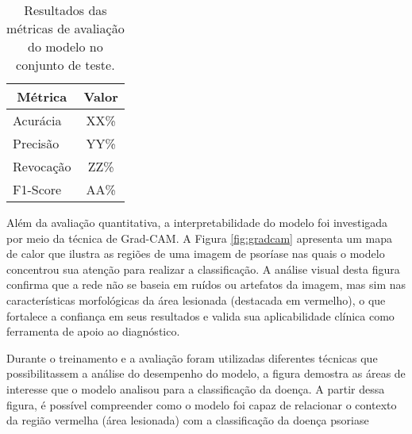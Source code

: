 \begin{table}[h]
  \centering
  \label{tab:resultados_metricas}
  \begin{tabular}{|l|c|}
  \hline
  \multicolumn{1}{|c|}{\textbf{Métrica}} & \textbf{Valor} \\ \hline
  Acurácia                               & XX\%           \\ \hline
  Precisão                               & YY\%           \\ \hline
  Revocação                              & ZZ\%           \\ \hline
  F1-Score                               & AA\%           \\ \hline
  \end{tabular}
  \caption{Resultados das métricas de avaliação do modelo no conjunto de teste.}
\end{table}

Além da avaliação quantitativa, a interpretabilidade do modelo foi investigada por meio da técnica de Grad-CAM. A Figura \ref{fig:gradcam} apresenta um mapa de calor que ilustra as regiões de uma imagem de psoríase nas quais o modelo concentrou sua atenção para realizar a classificação. A análise visual desta figura confirma que a rede não se baseia em ruídos ou artefatos da imagem, mas sim nas características morfológicas da área lesionada (destacada em vermelho), o que fortalece a confiança em seus resultados e valida sua aplicabilidade clínica como ferramenta de apoio ao diagnóstico.


Durante o treinamento e a avaliação foram utilizadas diferentes técnicas que possibilitassem a análise do desempenho do modelo, a figura demostra as áreas de interesse que o modelo analisou para a classificação da doença. A partir dessa figura, é possível compreender como o modelo foi capaz de relacionar o contexto da região vermelha (área lesionada) com a classificação da doença psoriase


\newpage


